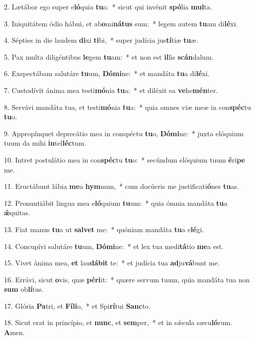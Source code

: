 2. Lætábor ego super e\textbf{ló}quia \textbf{tu}a:~*  sicut qui invénit \textbf{spó}lia \textbf{mul}ta.\

3. Iniquitátem ódio hábui, et ab\textbf{o}mi\textbf{ná}\textbf{tus} sum:~*  legem autem \textbf{tu}am di\textbf{lé}xi.\

4. Sépties in die laudem \textbf{di}xi \textbf{ti}bi,~*  super judícia jus\textbf{tí}tiæ \textbf{tu}æ.\

5. Pax multa diligéntibus \textbf{le}gem \textbf{tu}am:~*  et non est \textbf{il}lis \textbf{scán}dalum.\

6. Exspectábam salutáre \textbf{tu}um, \textbf{Dó}\textbf{mi}ne:~*  et mandáta \textbf{tu}a di\textbf{lé}xi.\

7. Custodívit ánima mea testi\textbf{mó}nia \textbf{tu}a:~*  et diléxit ea \textbf{ve}he\textbf{mén}ter.\

8. Servávi mandáta tua, et testi\textbf{mó}nia \textbf{tu}a:~*  quia omnes viæ meæ in con\textbf{spéc}tu \textbf{tu}o.\

9. Appropínquet deprecátio mea in conspéctu \textbf{tu}o, \textbf{Dó}\textbf{mi}ne:~*  juxta elóquium tuum da mihi \textbf{in}tel\textbf{léc}tum.\

10. Intret postulátio mea in con\textbf{spéc}tu \textbf{tu}o:~*  secúndum elóquium tuum \textbf{é}ri\textbf{pe} me.\

11. Eructábunt lábia \textbf{me}a \textbf{hym}num,~*  cum docúeris me justificati\textbf{ó}nes \textbf{tu}as.\

12. Pronuntiábit lingua mea e\textbf{ló}quium \textbf{tu}um:~*  quia ómnia mandáta \textbf{tu}a \textbf{ǽ}quitas.\

13. Fiat manus \textbf{tu}a ut \textbf{sal}\textbf{vet} me:~*  quóniam mandáta \textbf{tu}a e\textbf{lé}gi.\

14. Concupívi salutáre \textbf{tu}um, \textbf{Dó}\textbf{mi}ne:~*  et lex tua medi\textbf{tá}tio \textbf{me}a est.\

15. Vivet ánima mea, \textbf{et} lau\textbf{dá}\textbf{bit} te:~*  et judícia tua \textbf{ad}ju\textbf{vá}bunt me.\

16. Errávi, sicut \textbf{o}vis, quæ \textbf{pér}\textbf{i}it:~*  quære servum tuum, quia mandáta tua non \textbf{sum} ob\textbf{lí}tus.\

17. Glória \textbf{Pa}tri, et \textbf{Fí}\textbf{li}o,~*  et Spi\textbf{rí}tui \textbf{Sanc}to.\

18. Sicut erat in princípio, et \textbf{nunc}, et \textbf{sem}per,~*  et in sǽcula sæcu\textbf{ló}rum. \textbf{A}men.\

